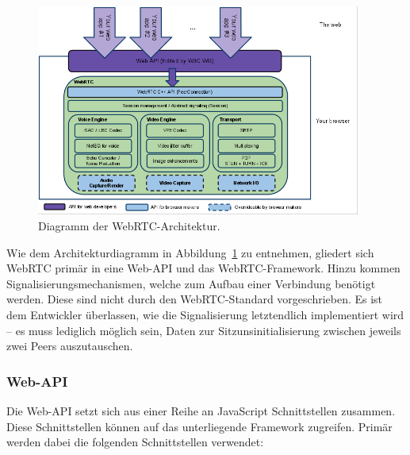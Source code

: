 \begin{figure}[h]
\centering
\includegraphics[width=0.95\textwidth]{bilder/webrtc-diagram.png}
\caption{Diagramm der WebRTC-Architektur.}
\label{fig:webrtcArchitecture}
\end{figure}

Wie dem Architekturdiagramm in Abbildung~\ref{fig:webrtcArchitecture} zu entnehmen, gliedert sich WebRTC primär in eine Web-\acs{API} und das \acs{WebRTC}-Framework. Hinzu kommen Signalisierungsmechanismen, welche zum Aufbau einer Verbindung benötigt werden. Diese sind nicht durch den WebRTC-Standard vorgeschrieben. Es ist dem Entwickler überlassen, wie die Signalisierung letztendlich implementiert wird -- es muss lediglich möglich sein, Daten zur Sitzunsinitialisierung zwischen jeweils zwei Peers auszutauschen.\par

\subsubsection*{Web-API}
Die Web-\acs{API} setzt sich aus einer Reihe an JavaScript Schnittstellen zusammen. Diese Schnittstellen können auf das unterliegende Framework zugreifen. Primär werden dabei die folgenden Schnittstellen verwendet:

